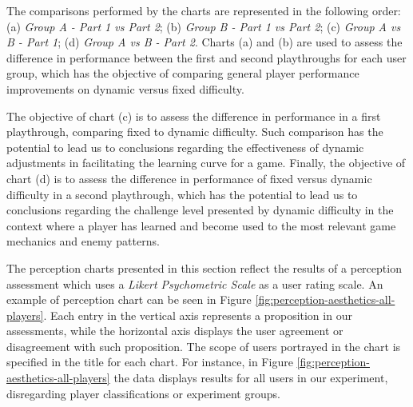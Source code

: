 The comparisons performed by the charts are represented in the following order: (a) \emph{Group A - Part 1 vs Part 2}; (b) \emph{Group B - Part 1 vs Part 2}; (c) \emph{Group A vs B - Part 1}; (d) \emph{Group A vs B - Part 2}. Charts (a) and (b) are used to assess the difference in performance between the first and second playthroughs for each user group, which has the objective of comparing general player performance improvements on dynamic versus fixed difficulty.

The objective of chart (c) is to assess the difference in performance in a first playthrough, comparing fixed to dynamic difficulty. Such comparison has the potential to lead us to conclusions regarding the effectiveness of dynamic adjustments in facilitating the learning curve for a game. Finally, the objective of chart (d) is to assess the difference in performance of fixed versus dynamic difficulty in a second playthrough, which has the potential to lead us to conclusions regarding the challenge level presented by dynamic difficulty in the context where a player has learned and become used to the most relevant game mechanics and enemy patterns.


The perception charts presented in this section reflect the results of a perception assessment which uses a \emph{Likert Psychometric Scale} as a user rating scale. An example of perception chart can be seen in Figure \ref{fig:perception-aesthetics-all-players}. Each entry in the vertical axis represents a proposition in our assessments, while the horizontal axis displays the user agreement or disagreement with such proposition. The scope of users portrayed in the chart is specified in the title for each chart. For instance, in Figure \ref{fig:perception-aesthetics-all-players} the data displays results for all users in our experiment, disregarding player classifications or experiment groups.

